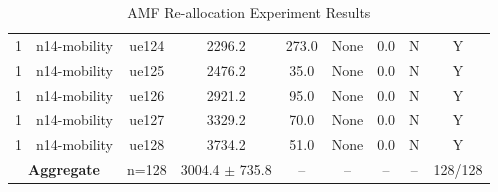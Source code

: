 \begin{table}[ht]
\begin{tabular}{|c|c|c|c|c|c|c|c|c|}
1 & n14-mobility & ue124 & 2296.2 & 273.0 & None & 0.0 & N & Y \\
1 & n14-mobility & ue125 & 2476.2 & 35.0 & None & 0.0 & N & Y \\
1 & n14-mobility & ue126 & 2921.2 & 95.0 & None & 0.0 & N & Y \\
1 & n14-mobility & ue127 & 3329.2 & 70.0 & None & 0.0 & N & Y \\
1 & n14-mobility & ue128 & 3734.2 & 51.0 & None & 0.0 & N & Y \\
\multicolumn{2}{|c|}{\textbf{Aggregate}} & n=128 & 3004.4 $\pm$ 735.8 & -- & -- & -- & -- & 128/128 \\
\hline
\end{tabular}
\caption{AMF Re-allocation Experiment Results}
\label{tab:amf_realloc}
\end{table}

